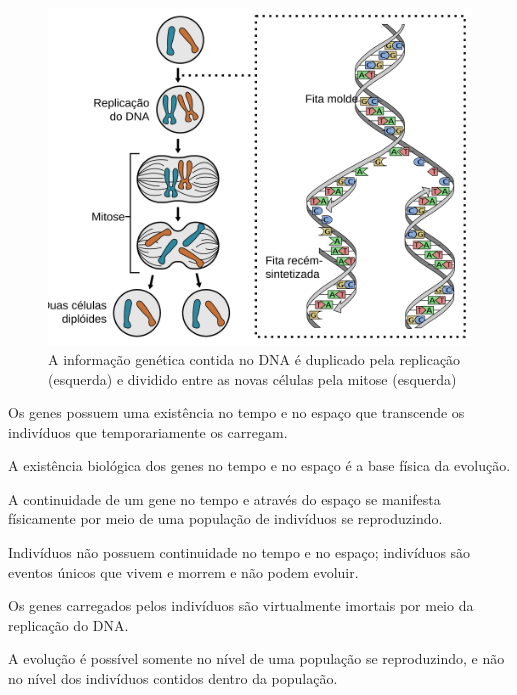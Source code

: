 \documentclass[
]{book}
\begin{document}
\begin{figure}

{\centering \includegraphics[width=600px]{figs/mitose_replicacao} 

}

\caption{A informação genética contida no DNA é duplicado pela replicação (esquerda) e dividido entre as novas células pela mitose (esquerda)}\label{fig:mitose}
\end{figure}

Os genes possuem uma existência no tempo e no espaço que transcende os indivíduos que temporariamente os carregam.

A existência biológica dos genes no tempo e no espaço é a base física da evolução.

A continuidade de um gene no tempo e através do espaço se manifesta físicamente por meio de uma população de indivíduos se reproduzindo.

Indivíduos não possuem continuidade no tempo e no espaço; indivíduos são eventos únicos que vivem e morrem e não podem evoluir.

Os genes carregados pelos indivíduos são virtualmente imortais por meio da replicação do DNA.

A evolução é possível somente no nível de uma população se reproduzindo, e não no nível dos indivíduos contidos dentro da população.
\end{document}
